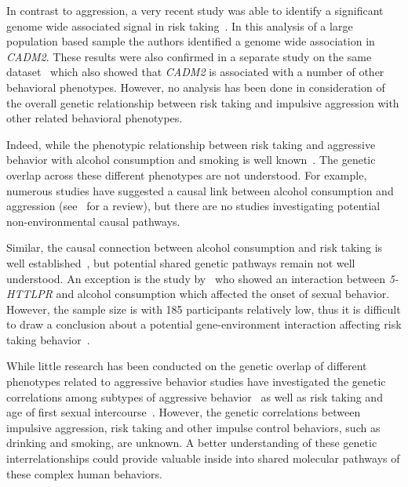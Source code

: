 In contrast to aggression, a very recent study was able to identify a significant genome wide associated signal in risk taking~\cite{Day2016}. 
In this analysis of a large population based sample the authors identified a genome wide association in \textit{CADM2}.
These results were also confirmed in a separate study on the same dataset~\cite{Boutwell2017} which also showed that \textit{CADM2} is associated with a number of other behavioral phenotypes.
However, no analysis has been done in consideration of the overall genetic relationship between risk taking and impulsive aggression with other related behavioral phenotypes.

Indeed, while the phenotypic relationship between risk taking and aggressive behavior with alcohol consumption and smoking is well known~\cite{FRANZKOWIAX1987,Zuckerman2000,Dakwar2011}.
The genetic overlap across these different phenotypes are not understood.
For example, numerous studies have suggested a causal link between alcohol consumption and aggression (see~\citet{Bushman1990} for a review), but there are no studies investigating potential non-environmental causal pathways.

Similar, the causal connection between alcohol consumption and risk taking is well established~\cite{Lane2004}, but potential shared genetic pathways remain not well understood.
An exception is the study by~\cite{Kogan2010} who showed an interaction between \textit{5-HTTLPR} and alcohol consumption which affected the onset of sexual behavior. 
However, the sample size is with 185 participants relatively low, thus it is difficult to draw a conclusion about a potential gene-environment interaction affecting risk taking behavior~\cite{Rubens2016}.

While little research has been conducted on the genetic overlap of different phenotypes related to aggressive behavior studies have investigated the genetic correlations among subtypes of aggressive behavior~\cite{Tuvblad2011a} as well as risk taking and age of first sexual intercourse~\cite{Day2016}.
However, the genetic correlations between impulsive aggression, risk taking and other impulse control behaviors, such as drinking and smoking, are unknown.
A better understanding of these genetic interrelationships could provide valuable inside into shared molecular pathways of these complex human behaviors.


